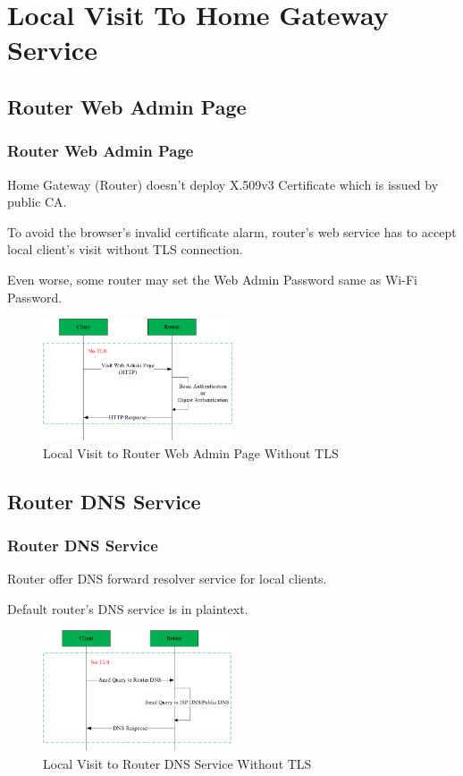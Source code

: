 \documentclass{ctexbeamer}
\begin{document}
\section{Local Visit To Home Gateway Service}

\subsection{Router Web Admin Page}
\begin{frame}
\frametitle{Router Web Admin Page}

Home Gateway (Router) doesn't deploy X.509v3 Certificate which is issued by public CA.

To avoid the browser's invalid certificate alarm, router's web service has to accept local client's visit without TLS connection.

Even worse, some router may set the Web Admin Password same as Wi-Fi Password.

    \begin{figure}[H]
        \centering 
        \includegraphics[width=0.5\textwidth]{pic/web_adm.png} 
        \caption{Local Visit to Router Web Admin Page Without TLS} 
        \label{fig.web.adm}
    \end{figure}

\end{frame}

\subsection{Router DNS Service}
\begin{frame}
\frametitle{Router DNS Service}

Router offer DNS forward resolver service for local clients.

Default router's DNS service is in plaintext.

    \begin{figure}[H]
        \centering 
        \includegraphics[width=0.5\textwidth]{pic/router_dns.png} 
        \caption{Local Visit to Router DNS Service Without TLS} 
        \label{fig.router.dns}
    \end{figure}

\end{frame}
\end{document}
